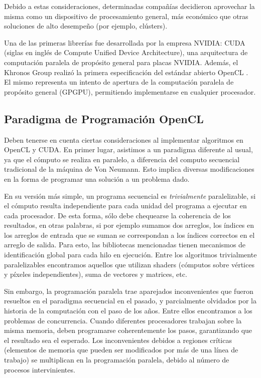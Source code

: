 Debido a estas consideraciones, determinadas compañías decidieron aprovechar la misma como un dispositivo de procesamiento general, más económico que otras soluciones de alto desempeño (por ejemplo, clústers).


Una de las primeras librerías fue desarrollada por la empresa NVIDIA: \acrshort{CUDA} (siglas en ingl\'es de Compute Unified Device Architecture), una arquitectura de computaci\'on paralela de prop\'osito general para placas NVIDIA.
Además, el Khronos Group realizó la primera especificación del estándar abierto OpenCL \cite{Stone2010}.
El mismo representa un intento de apertura de la computación paralela de propósito general (GPGPU), permitiendo implementarse en cualquier procesador.

\subsection{Paradigma de Programación OpenCL}
Deben tenerse en cuenta ciertas consideraciones al implementar algoritmos en OpenCL y CUDA.
En primer lugar, asistimos a un paradigma diferente al usual, ya que el cómputo se realiza en paralelo, a diferencia del computo secuencial tradicional de la máquina de Von Neumann.
Esto implica diversas modificaciones en la forma de programar una solución a un problema dado.

En su versión más simple, un programa secuencial es {\em trivialmente} paralelizable, si el cómputo resulta independiente para cada unidad del programa a ejecutar en cada procesador.
De esta forma, sólo debe chequearse la coherencia de los resultados, en otras palabras, si por ejemplo sumamos dos arreglos, los índices en los arreglos de entrada que se suman se correspondan a los índices correctos en el arreglo de salida.
Para esto, las bibliotecas mencionadas tienen mecanismos de identificación global para cada hilo en ejecución.
Entre los algoritmos trivialmente paralelizables encontramos aquellos que utilizan shaders (cómputos sobre vértices y píxeles independientes), suma de vectores y matrices, etc.

Sin embargo, la programación paralela trae aparejados inconvenientes que fueron resueltos en el paradigma secuencial en el pasado, y parcialmente olvidados por la historia de la computación con el paso de los años.
Entre ellos encontramos a los problemas de concurrencia.
Cuando diferentes procesadores trabajan sobre la misma memoria, deben programarse coherentemente los pasos, garantizando que el resultado sea el esperado.
Los inconvenientes debidos a regiones críticas (elementos de memoria que pueden ser modificados por más de una línea de trabajo) se multiplican en la programación paralela, debido al número de procesos intervinientes.

